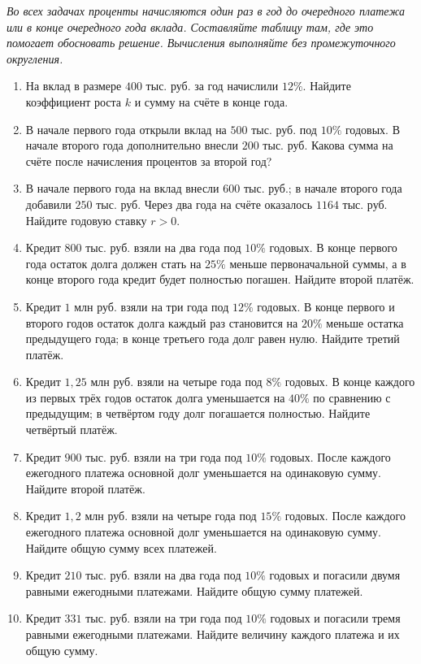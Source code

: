 \documentclass[a4paper,12pt]{article}
\newcommand{\sechead}[1]{\vspace{7pt}{\large\bfseries\color{darkaccent}#1}\par\vspace{2pt}}
\begin{document}
\sechead{7. Тренировка --- Путь А}
\textit{Во всех задачах проценты начисляются один раз в год до очередного платежа или в конце очередного года вклада. Составляйте таблицу там, где это помогает обосновать решение. Вычисления выполняйте без промежуточного округления.}
\begin{enumerate}[label=\textbf{\arabic*.}]
\item На вклад в размере $400$ тыс. руб. за год начислили $12\%$. Найдите коэффициент роста $k$ и сумму на счёте в конце года.
\item В начале первого года открыли вклад на $500$ тыс. руб. под $10\%$ годовых. В начале второго года дополнительно внесли $200$ тыс. руб. Какова сумма на счёте после начисления процентов за второй год?
\item В начале первого года на вклад внесли $600$ тыс. руб.; в начале второго года добавили $250$ тыс. руб. Через два года на счёте оказалось $1164$ тыс. руб. Найдите годовую ставку $r>0$.
\item Кредит $800$ тыс. руб. взяли на два года под $10\%$ годовых. В конце первого года остаток долга должен стать на $25\%$ меньше первоначальной суммы, а в конце второго года кредит будет полностью погашен. Найдите второй платёж.
\item Кредит $1$ млн руб. взяли на три года под $12\%$ годовых. В конце первого и второго годов остаток долга каждый раз становится на $20\%$ меньше остатка предыдущего года; в конце третьего года долг равен нулю. Найдите третий платёж.
\item Кредит $1{,}25$ млн руб. взяли на четыре года под $8\%$ годовых. В конце каждого из первых трёх годов остаток долга уменьшается на $40\%$ по сравнению с предыдущим; в четвёртом году долг погашается полностью. Найдите четвёртый платёж.
\item Кредит $900$ тыс. руб. взяли на три года под $10\%$ годовых. После каждого ежегодного платежа основной долг уменьшается на одинаковую сумму. Найдите второй платёж.
\item Кредит $1{,}2$ млн руб. взяли на четыре года под $15\%$ годовых. После каждого ежегодного платежа основной долг уменьшается на одинаковую сумму. Найдите общую сумму всех платежей.
\item Кредит $210$ тыс. руб. взяли на два года под $10\%$ годовых и погасили двумя равными ежегодными платежами. Найдите общую сумму платежей.
\item Кредит $331$ тыс. руб. взяли на три года под $10\%$ годовых и погасили тремя равными ежегодными платежами. Найдите величину каждого платежа и их общую сумму.
\end{enumerate}
\end{document}
